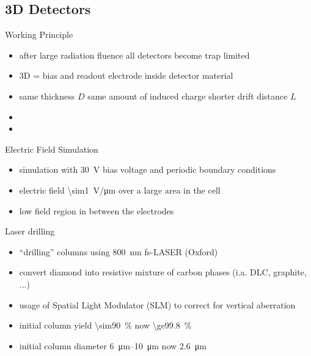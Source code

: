 \subsection{3D Detectors}
\begin{frame}{Working Principle}

	\vspace*{-10pt}\vspace*{-10pt}
	
	\begin{itemize}\itemfill
		\item after large radiation fluence all detectors become trap limited
		\item 3D = bias and readout electrode inside detector material
		\item same thickness $D$ \ra same amount of induced charge \ra shorter drift distance $L$
		\item {}
		\item {}
	\end{itemize}

\end{frame}
\begin{frame}{Electric Field Simulation}

	\vspace*{-10pt}
	
	\begin{itemize}\itemfill
		\item simulation with \SI{30}{\volt} bias voltage and periodic boundary conditions
		\item electric field \SI{\sim1}{\volt/\micro\meter} over a large area in the cell
		\item low field region in between the electrodes
	\end{itemize}

\end{frame}


\begin{frame}{Laser drilling}

	\begin{itemize}\itemfill
		\item ``drilling'' columns using \SI{800}{\nano\meter} fs-LASER (Oxford)
		\item convert diamond into resistive mixture of carbon phases (i.a. DLC, graphite, ...)
		\item usage of Spatial Light Modulator (SLM) to correct for vertical aberration
		\item initial column yield \SI{\sim90}{\%} \ra now \SI{\ge99.8}{\%}
		\item  initial column diameter \SIrange{6}{10}{\micro\meter} \ra now \SI{2.6}{\micro\meter}
	\end{itemize}
	
	\vspace*{-10pt}
	
\end{frame}

